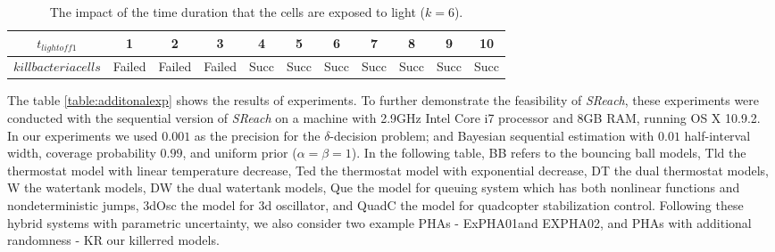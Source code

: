 \begin{table*}[th!]
\captionsetup{font=scriptsize}
\centering
    \begin{tabular}{|c|c|c|c|c|c|c|c|c|c|c|}
    \hline
    $t_{lightoff1}$ & 1 & 2 & 3 & 4 & 5 & 6 & 7 & 8 & 9 & 10 \\ \hline
    $kill bacteria cells$ & Failed  & Failed    &  Failed   & Succ   & Succ & Succ & Succ & Succ & Succ & Succ    \\ \hline
    \end{tabular}
    \caption{The impact of the time duration that the cells are exposed to light ($k=6$).}
    \label{table:kr03}
\end{table*}

The table \ref{table:additonalexp} shows the results of experiments. To further demonstrate the feasibility of {\it SReach}, these experiments were conducted with the sequential version of {\it SReach} on a machine with 2.9GHz Intel Core i7 processor and 8GB RAM, running OS X 10.9.2. In our experiments we used $0.001$ as the precision for the $\delta$-decision problem; and Bayesian sequential estimation with $0.01$ half-interval width, coverage probability $0.99$, and uniform prior ($\alpha = \beta = 1$). In the following table, BB refers to the bouncing ball models, Tld the thermostat model with linear temperature decrease, Ted the thermostat model with exponential decrease, DT the dual thermostat models, W the watertank models, DW the dual watertank models, Que the model for queuing system which has both nonlinear functions and nondeterministic jumps, 3dOsc the model for 3d oscillator, and QuadC the model for quadcopter stabilization control. Following these hybrid systems with parametric uncertainty, we also consider two example PHAs - ExPHA01and EXPHA02, and PHAs with additional randomness - KR our killerred models.

